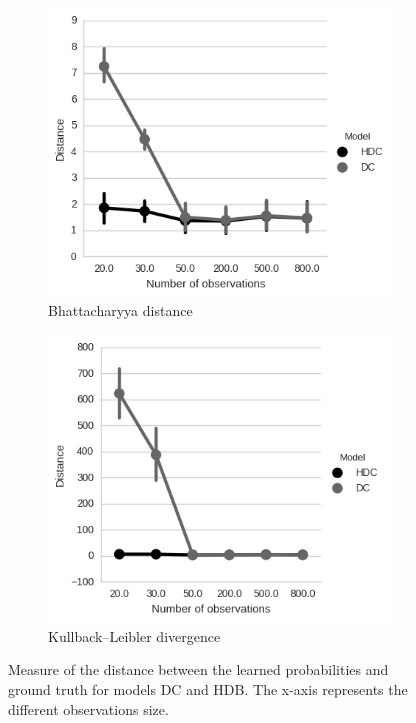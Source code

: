 \begin{figure}[htp]
\centering

\begin{subfigure}{.45\textwidth}
  \centering
  \includegraphics[width=\linewidth]{images/Eval-HDC-Bhattacharya-Distance.png}
    \caption{Bhattacharyya distance}
\end{subfigure}
\begin{subfigure}{.45\textwidth}
  \centering
  \includegraphics[width=\linewidth]{images/Eval-DC-KL-Distance.png}
    \caption{Kullback–Leibler divergence}
\end{subfigure}

\caption[DC, HDC Model Validation]{Measure of the distance between the learned probabilities and ground truth for models DC and HDB. The x-axis represents the different observations size.}
\label{fig:eval-B-KL-evaluation}
\end{figure}

